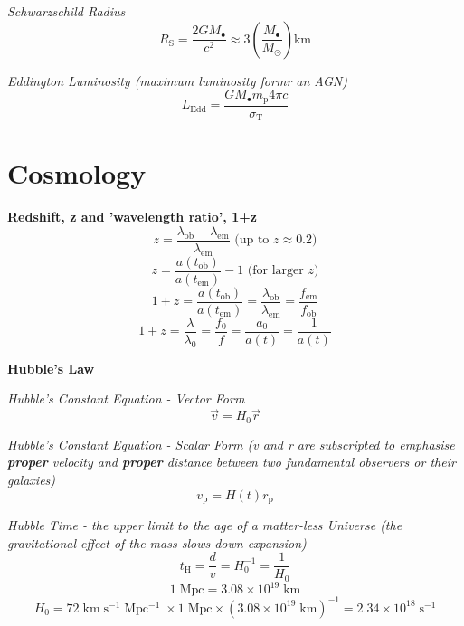 \documentclass{article}
\begin{document}
\textit {Schwarzschild Radius}
\begin{equation}
R_\mathrm{S} = \frac {2 G M_\bullet}{c^2} \approx 3 \left(\frac {M_\bullet}{M_\odot} \right) \mathrm{km}
\end{equation}

\textit {Eddington Luminosity (maximum luminosity formr an AGN)}
\begin{equation}
L_\mathrm{Edd} = \frac {G M_\bullet m_\mathrm{p} 4 \pi c}{\sigma_\mathrm{T}}
\end{equation}




\newpage

\section{Cosmology}

\textbf {Redshift, z and 'wavelength ratio', 1+z}
\begin{equation}
z = \frac {\lambda_\mathrm{ob} - \lambda_\mathrm{em}}{\lambda_\mathrm{em}} \text{ (up to \(z \approx 0.2\))}
\end{equation}
\begin{equation}
z = \frac {a(t_\mathrm{ob})}{a(t_\mathrm{em})} - 1 \text{ (for larger \(z\))}
\end{equation}
\begin{equation}
1 + z = \frac{a(t_\mathrm{ob})}{a(t_\mathrm{em})} = \frac {\lambda_\mathrm{ob}}{\lambda_\mathrm{em}} = \frac {f_\mathrm{em}}{f_\mathrm{ob}}
\end{equation}
\begin{equation}
1 + z  = \frac{\lambda}{\lambda_\mathrm{0}} = \frac {f_\mathrm{0}}{f} = \frac{a_\mathrm{0}}{a(t)} = \frac{1}{a(t)}
\end{equation}


\textbf {Hubble's Law}

\textit {Hubble's Constant Equation - Vector Form}
\begin{equation}
\vec{v} = H_0 \vec{r}
\end{equation}

\textit {Hubble's Constant Equation - Scalar Form (v and r are subscripted to emphasise \textbf{proper} velocity and \textbf{proper} distance between two fundamental observers or their galaxies)}
\begin{equation}
v_\mathrm{p} = H(t) r_\mathrm{p}
\end{equation}

\textit {Hubble Time - the upper limit to the age of a matter-less Universe (the gravitational effect of the mass slows down expansion)}
\begin{equation}
t_\mathrm{H} = \frac {d}{v} = H_\mathrm{0}^{-1} = \frac {1}{H_\mathrm{0}}
\end{equation}
\begin{equation}
1 \; \mathrm{Mpc} = 3.08 \times 10^{19} \; \mathrm{km}
\end{equation}
\begin{equation}
H_\mathrm{0} = 72 \; \mathrm{km} \;  \mathrm{s^{-1}} \; \mathrm{Mpc^{-1}} \; \times 1 \; \mathrm{Mpc} \times (3.08 \times 10^{19} \; \mathrm{km})^{-1} = 2.34 \times 10^{18} \; \mathrm{s^{-1}}
\end{equation}
\end{document}
